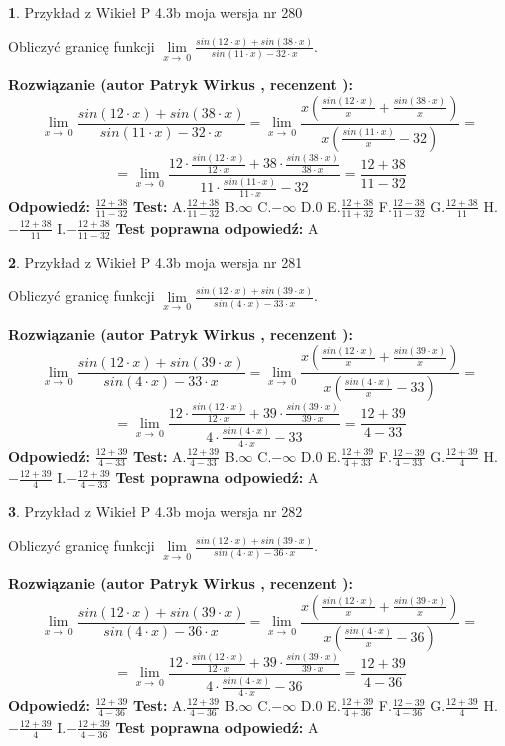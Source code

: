 \documentclass[12pt, a4paper]{article}
\theoremstyle{definition} %
\newtheorem{zad}{}
\newcommand{\zadStart}[1]{\begin{zad}#1\newline}
\newcommand{\zadStop}{\end{zad}}
\newcommand{\rozwStart}[2]{\noindent \textbf{Rozwiązanie (autor #1 , recenzent #2): }\newline}
\newcommand{\rozwStop}{\newline}
\newcommand{\odpStart}{\noindent \textbf{Odpowiedź:}\newline}
\newcommand{\odpStop}{\newline}
\newcommand{\testStart}{\noindent \textbf{Test:}\newline}
\newcommand{\testStop}{\newline}
\newcommand{\kluczStart}{\noindent \textbf{Test poprawna odpowiedź:}\newline}
\newcommand{\kluczStop}{\newline}
\begin{document}
\zadStart{Przykład z Wikieł P 4.3b moja wersja nr 280}


Obliczyć granicę funkcji $\lim\limits_{x\to\ 0}\frac{sin(12 \cdot x)+sin(38 \cdot x)}{sin(11 \cdot x)-32 \cdot x}$.
\zadStop
\rozwStart{Patryk Wirkus}{}
$$\lim\limits_{x\to\ 0}\frac{sin(12 \cdot x)+sin(38 \cdot x)}{sin(11 \cdot x)-32 \cdot x}=\lim\limits_{x\to\ 0}\frac{x(\frac{sin(12 \cdot x)}{x}+\frac{sin(38 \cdot x)}{x})}{x(\frac{sin(11 \cdot x)}{x}-32)}=$$
$$=\lim\limits_{x\to\ 0}\frac{12 \cdot \frac{sin(12 \cdot x)}{12 \cdot x}+38 \cdot \frac{sin(38 \cdot x)}{38 \cdot x}}{11 \cdot \frac{sin(11 \cdot x)}{11 \cdot x}-32}=\frac{12+38}{11-32}$$
\rozwStop
\odpStart
$\frac{12+38}{11-32}$
\odpStop
\testStart
A.$\frac{12+38}{11-32}$
B.$\infty$
C.$-\infty$
D.$0$
E.$\frac{12+38}{11+32}$
F.$\frac{12-38}{11-32}$
G.$\frac{12+38}{11}$
H.$-\frac{12+38}{11}$
I.$-\frac{12+38}{11-32}$
\testStop
\kluczStart
A
\kluczStop



\zadStart{Przykład z Wikieł P 4.3b moja wersja nr 281}


Obliczyć granicę funkcji $\lim\limits_{x\to\ 0}\frac{sin(12 \cdot x)+sin(39 \cdot x)}{sin(4 \cdot x)-33 \cdot x}$.
\zadStop
\rozwStart{Patryk Wirkus}{}
$$\lim\limits_{x\to\ 0}\frac{sin(12 \cdot x)+sin(39 \cdot x)}{sin(4 \cdot x)-33 \cdot x}=\lim\limits_{x\to\ 0}\frac{x(\frac{sin(12 \cdot x)}{x}+\frac{sin(39 \cdot x)}{x})}{x(\frac{sin(4 \cdot x)}{x}-33)}=$$
$$=\lim\limits_{x\to\ 0}\frac{12 \cdot \frac{sin(12 \cdot x)}{12 \cdot x}+39 \cdot \frac{sin(39 \cdot x)}{39 \cdot x}}{4 \cdot \frac{sin(4 \cdot x)}{4 \cdot x}-33}=\frac{12+39}{4-33}$$
\rozwStop
\odpStart
$\frac{12+39}{4-33}$
\odpStop
\testStart
A.$\frac{12+39}{4-33}$
B.$\infty$
C.$-\infty$
D.$0$
E.$\frac{12+39}{4+33}$
F.$\frac{12-39}{4-33}$
G.$\frac{12+39}{4}$
H.$-\frac{12+39}{4}$
I.$-\frac{12+39}{4-33}$
\testStop
\kluczStart
A
\kluczStop



\zadStart{Przykład z Wikieł P 4.3b moja wersja nr 282}


Obliczyć granicę funkcji $\lim\limits_{x\to\ 0}\frac{sin(12 \cdot x)+sin(39 \cdot x)}{sin(4 \cdot x)-36 \cdot x}$.
\zadStop
\rozwStart{Patryk Wirkus}{}
$$\lim\limits_{x\to\ 0}\frac{sin(12 \cdot x)+sin(39 \cdot x)}{sin(4 \cdot x)-36 \cdot x}=\lim\limits_{x\to\ 0}\frac{x(\frac{sin(12 \cdot x)}{x}+\frac{sin(39 \cdot x)}{x})}{x(\frac{sin(4 \cdot x)}{x}-36)}=$$
$$=\lim\limits_{x\to\ 0}\frac{12 \cdot \frac{sin(12 \cdot x)}{12 \cdot x}+39 \cdot \frac{sin(39 \cdot x)}{39 \cdot x}}{4 \cdot \frac{sin(4 \cdot x)}{4 \cdot x}-36}=\frac{12+39}{4-36}$$
\rozwStop
\odpStart
$\frac{12+39}{4-36}$
\odpStop
\testStart
A.$\frac{12+39}{4-36}$
B.$\infty$
C.$-\infty$
D.$0$
E.$\frac{12+39}{4+36}$
F.$\frac{12-39}{4-36}$
G.$\frac{12+39}{4}$
H.$-\frac{12+39}{4}$
I.$-\frac{12+39}{4-36}$
\testStop
\kluczStart
A
\kluczStop
\end{document}
